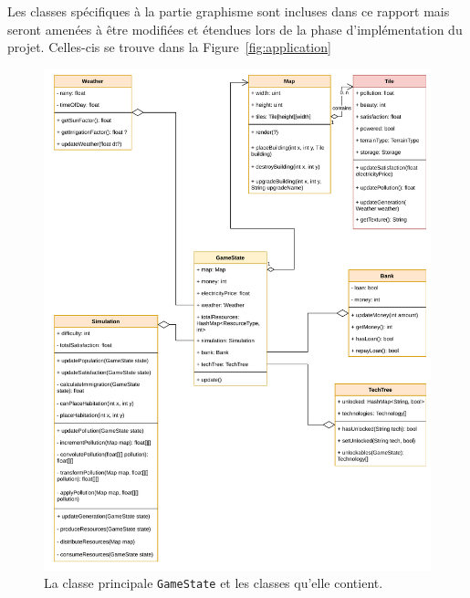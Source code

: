 \documentclass[12pt]{article}
\begin{document}
Les classes spécifiques à la partie graphisme sont incluses dans ce rapport mais seront amenées à être modifiées et étendues lors de la phase d'implémentation du projet. Celles-cis se trouve dans la Figure~\ref{fig:application}

\begin{figure}[ht]
\includegraphics[width=\textwidth]{uml-classes-Page-2}
\caption{La classe principale \texttt{GameState} et les classes qu'elle contient.\label{fig:gamestate}}
\end{figure}
\end{document}
